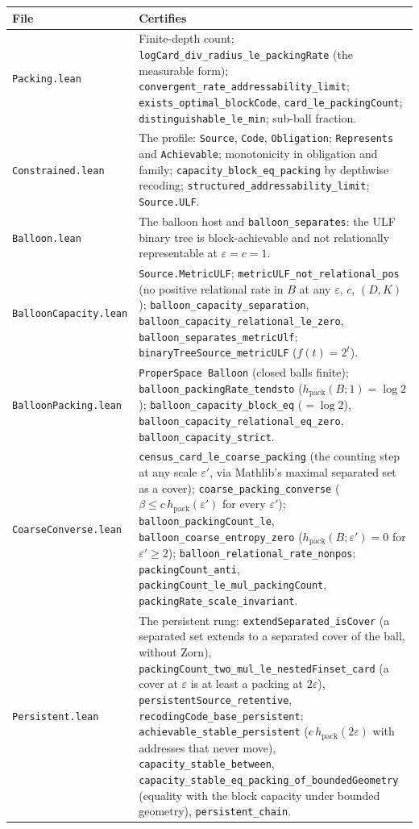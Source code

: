 \documentclass[11pt,a4paper]{article}
\theoremstyle{plain}
\theoremstyle{definition}
\theoremstyle{remark}
\newcommand{\hpack}{h_{\mathrm{pack}}}
\begin{document}
{\footnotesize
\begin{longtable}{@{}>{\raggedright\arraybackslash}p{4.3cm}>{\raggedright\arraybackslash}p{10.6cm}@{}}
\toprule
\textbf{File} & \textbf{Certifies} \\
\midrule
\texttt{Packing.lean} & Finite-depth count; \texttt{logCard\_div\_radius\_le\_packingRate} (the measurable form); \texttt{convergent\_rate\_addressability\_limit}; \texttt{exists\_optimal\_blockCode}, \texttt{card\_le\_packingCount}; \texttt{distinguishable\_le\_min}; sub-ball fraction. \\
\texttt{Constrained.lean} & The profile: \texttt{Source}, \texttt{Code}, \texttt{Obligation}; \texttt{Represents} and \texttt{Achievable}; monotonicity in obligation and family; \texttt{capacity\_block\_eq\_packing} by depthwise recoding; \texttt{structured\_addressability\_limit}; \texttt{Source.ULF}. \\
\texttt{Balloon.lean} & The balloon host and \texttt{balloon\_separates}: the ULF binary tree is block-achievable and not relationally representable at $\varepsilon=c=1$. \\
\texttt{BalloonCapacity.lean} & \texttt{Source.MetricULF}; \texttt{metricULF\_not\_relational\_pos} (no positive relational rate in $B$ at any $\varepsilon$, $c$, $(D,K)$); \texttt{balloon\_capacity\_separation}, \texttt{balloon\_capacity\_relational\_le\_zero}, \texttt{balloon\_separates\_metricUlf}; \texttt{binaryTreeSource\_metricULF} ($f(t)=2^t$). \\
\texttt{BalloonPacking.lean} & \texttt{ProperSpace Balloon} (closed balls finite); \texttt{balloon\_packingRate\_tendsto} ($\hpack(B;1)=\log2$); \texttt{balloon\_capacity\_block\_eq} ($=\log2$), \texttt{balloon\_capacity\_relational\_eq\_zero}, \texttt{balloon\_capacity\_strict}. \\
\texttt{CoarseConverse.lean} & \texttt{census\_card\_le\_coarse\_packing} (the counting step at any scale $\varepsilon'$, via Mathlib's maximal separated set as a cover); \texttt{coarse\_packing\_converse} ($\beta\le c\,\hpack(\varepsilon')$ for every $\varepsilon'$); \texttt{balloon\_packingCount\_le}, \texttt{balloon\_coarse\_entropy\_zero} ($\hpack(B;\varepsilon')=0$ for $\varepsilon'\ge2$); \texttt{balloon\_relational\_rate\_nonpos}; \texttt{packingCount\_anti}, \texttt{packingCount\_le\_mul\_packingCount}, \texttt{packingRate\_scale\_invariant}. \\
\texttt{Persistent.lean} & The persistent rung: \texttt{extendSeparated\_isCover} (a separated set extends to a separated cover of the ball, without Zorn), \texttt{packingCount\_two\_mul\_le\_nestedFinset\_card} (a cover at $\varepsilon$ is at least a packing at $2\varepsilon$), \texttt{persistentSource\_retentive}, \texttt{recodingCode\_base\_persistent}; \texttt{achievable\_stable\_persistent} ($c\,\hpack(2\varepsilon)$ with addresses that never move), \texttt{capacity\_stable\_between}, \texttt{capacity\_stable\_eq\_packing\_of\_boundedGeometry} (equality with the block capacity under bounded geometry), \texttt{persistent\_chain}. \\

\end{longtable}}
\end{document}
